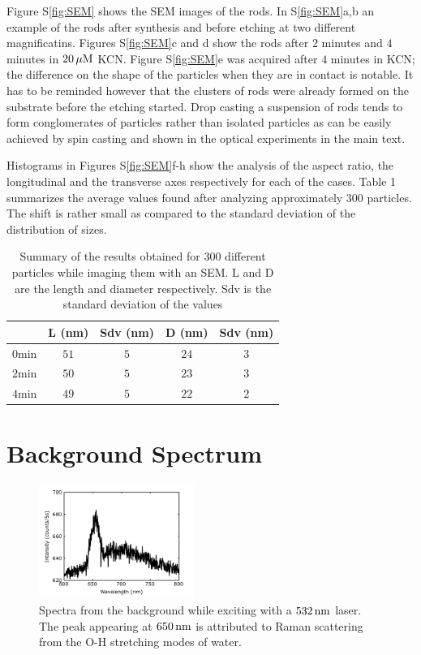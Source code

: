 Figure S\ref{fig:SEM} shows the SEM images of the rods. In S\ref{fig:SEM}a,b an
example of the rods after synthesis and before etching at two different
magnificatins. Figures S\ref{fig:SEM}c and d show the rods after $2$ minutes and
$4$ minutes in $20\,\mu\textrm{M}$ KCN. Figure S\ref{fig:SEM}e was acquired after $4$
minutes in KCN; the difference on the shape of the particles when they are in
contact is notable. It has to be reminded however that the clusters of rods were
already formed on the substrate before the etching started. Drop casting a
suspension of rods tends to form conglomerates of particles rather than isolated
particles as can be easily achieved by spin casting and shown in the optical
experiments in the main text.

Histograms in Figures S\ref{fig:SEM}f-h show the
analysis of the aspect ratio, the longitudinal and the transverse axes
respectively for each of the cases. Table 1 summarizes the average values found
after analyzing approximately $300$ particles. The shift is rather small as
compared to the standard deviation of the distribution of sizes. 

\begin{table}[htp]
\begin{tabular*}{0.48\textwidth}{c c c c c}
 $\,$ & L (nm) & Sdv (nm) & D (nm) & Sdv (nm) \\\hline
 $0\textrm{min}$ & $51$ & $5$ & $24$ & $3$ \\
 $2\textrm{min}$ & $50$ & $5$ & $23$ & $3$ \\
 $4\textrm{min}$ & $49$ & $5$ & $22$ & $2$ \\
\end{tabular*}
\label{tab:SEM_results}
\caption{Summary of the results obtained for 300 different particles while
imaging them with an SEM. L and D are the length and diameter respectively.
Sdv is the standard deviation of the values}
\end{table}

\section{Background Spectrum}

\begin{figure}[htp]
 \centering
 \includegraphics[width=0.45\textwidth]{Chapters/02_KCN/Figures/04_Supporting/03_Background/background.png}
 \caption{Spectra from the background while exciting with a $532\,\textrm{nm}$ laser. The
 peak appearing at $650\,\textrm{nm}$ is attributed to Raman scattering from the O-H stretching modes of water.}
 \label{fig:Background}
\end{figure}

